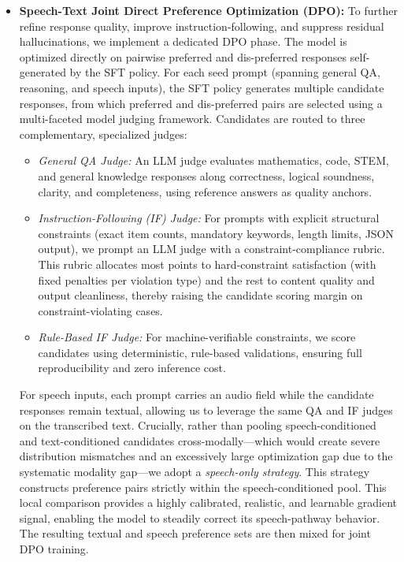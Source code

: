 \begin{itemize}
    \item \textbf{Speech-Text Joint Direct Preference Optimization (DPO):} To further refine response quality, improve instruction-following, and suppress residual hallucinations, we implement a dedicated DPO phase. The model is optimized directly on pairwise preferred and dis-preferred responses self-generated by the SFT policy. For each seed prompt (spanning general QA, reasoning, and speech inputs), the SFT policy generates multiple candidate responses, from which preferred and dis-preferred pairs are selected using a multi-faceted model judging framework. Candidates are routed to three complementary, specialized judges:
    \begin{itemize}
        \item \textit{General QA Judge:} An LLM judge evaluates mathematics, code, STEM, and general knowledge responses along correctness, logical soundness, clarity, and completeness, using reference answers as quality anchors.
        \item \textit{Instruction-Following (IF) Judge:} For prompts with explicit structural constraints (exact item counts, mandatory keywords, length limits, JSON output), we prompt an LLM judge with a constraint-compliance rubric. This rubric allocates most points to hard-constraint satisfaction (with fixed penalties per violation type) and the rest to content quality and output cleanliness, thereby raising the candidate scoring margin on constraint-violating cases.
        \item \textit{Rule-Based IF Judge:} For machine-verifiable constraints, we score candidates using deterministic, rule-based validations, ensuring full reproducibility and zero inference cost.
    \end{itemize}
    For speech inputs, each prompt carries an audio field while the candidate responses remain textual, allowing us to leverage the same QA and IF judges on the transcribed text. Crucially, rather than pooling speech-conditioned and text-conditioned candidates cross-modally—which would create severe distribution mismatches and an excessively large optimization gap due to the systematic modality gap—we adopt a \textit{speech-only strategy}. This strategy constructs preference pairs strictly within the speech-conditioned pool. This local comparison provides a highly calibrated, realistic, and learnable gradient signal, enabling the model to steadily correct its speech-pathway behavior. The resulting textual and speech preference sets are then mixed for joint DPO training.
\end{itemize}

